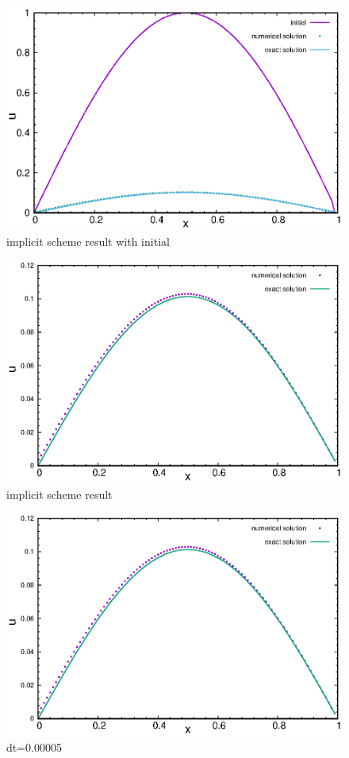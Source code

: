 \documentclass[12pt]{article}
\begin{document}
\begin{figure}
    \centering
    \includegraphics{img/implicit.eps}
    \caption{implicit scheme result with initial}
    \label{fig:implicit}
\end{figure}

\begin{figure}
    \centering
    \includegraphics{img/implicit1.eps}
    \caption{implicit scheme result }
    \label{fig:implicit1}
\end{figure}

\begin{figure}
    \centering
    \includegraphics{img/t00005.eps}
    \caption{dt=0.00005}
    \label{fig:t00005}
\end{figure}
\end{document}

